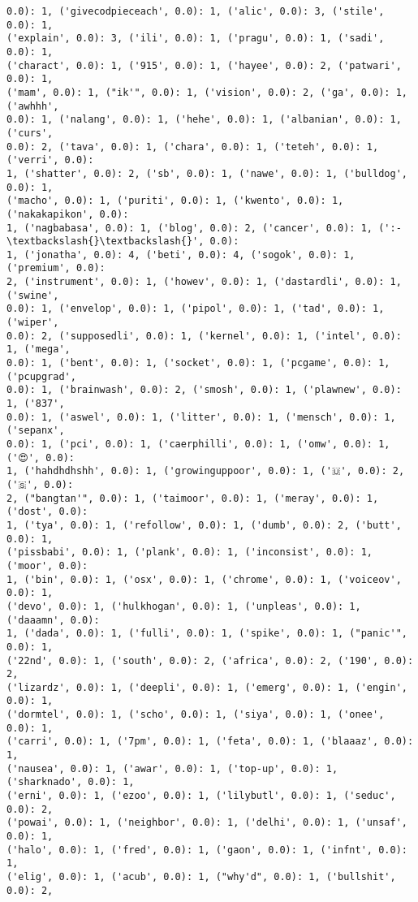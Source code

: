 \documentclass[11pt]{article}
\begin{document}
\begin{Verbatim}[commandchars=\\\{\}]
0.0): 1, ('givecodpieceach', 0.0): 1, ('alic', 0.0): 3, ('stile', 0.0): 1,
('explain', 0.0): 3, ('ili', 0.0): 1, ('pragu', 0.0): 1, ('sadi', 0.0): 1,
('charact', 0.0): 1, ('915', 0.0): 1, ('hayee', 0.0): 2, ('patwari', 0.0): 1,
('mam', 0.0): 1, ("ik'", 0.0): 1, ('vision', 0.0): 2, ('ga', 0.0): 1, ('awhhh',
0.0): 1, ('nalang', 0.0): 1, ('hehe', 0.0): 1, ('albanian', 0.0): 1, ('curs',
0.0): 2, ('tava', 0.0): 1, ('chara', 0.0): 1, ('teteh', 0.0): 1, ('verri', 0.0):
1, ('shatter', 0.0): 2, ('sb', 0.0): 1, ('nawe', 0.0): 1, ('bulldog', 0.0): 1,
('macho', 0.0): 1, ('puriti', 0.0): 1, ('kwento', 0.0): 1, ('nakakapikon', 0.0):
1, ('nagbabasa', 0.0): 1, ('blog', 0.0): 2, ('cancer', 0.0): 1, (':-\textbackslash{}\textbackslash{}', 0.0):
1, ('jonatha', 0.0): 4, ('beti', 0.0): 4, ('sogok', 0.0): 1, ('premium', 0.0):
2, ('instrument', 0.0): 1, ('howev', 0.0): 1, ('dastardli', 0.0): 1, ('swine',
0.0): 1, ('envelop', 0.0): 1, ('pipol', 0.0): 1, ('tad', 0.0): 1, ('wiper',
0.0): 2, ('supposedli', 0.0): 1, ('kernel', 0.0): 1, ('intel', 0.0): 1, ('mega',
0.0): 1, ('bent', 0.0): 1, ('socket', 0.0): 1, ('pcgame', 0.0): 1, ('pcupgrad',
0.0): 1, ('brainwash', 0.0): 2, ('smosh', 0.0): 1, ('plawnew', 0.0): 1, ('837',
0.0): 1, ('aswel', 0.0): 1, ('litter', 0.0): 1, ('mensch', 0.0): 1, ('sepanx',
0.0): 1, ('pci', 0.0): 1, ('caerphilli', 0.0): 1, ('omw', 0.0): 1, ('😍', 0.0):
1, ('hahdhdhshh', 0.0): 1, ('growinguppoor', 0.0): 1, ('🇺', 0.0): 2, ('🇸', 0.0):
2, ("bangtan'", 0.0): 1, ('taimoor', 0.0): 1, ('meray', 0.0): 1, ('dost', 0.0):
1, ('tya', 0.0): 1, ('refollow', 0.0): 1, ('dumb', 0.0): 2, ('butt', 0.0): 1,
('pissbabi', 0.0): 1, ('plank', 0.0): 1, ('inconsist', 0.0): 1, ('moor', 0.0):
1, ('bin', 0.0): 1, ('osx', 0.0): 1, ('chrome', 0.0): 1, ('voiceov', 0.0): 1,
('devo', 0.0): 1, ('hulkhogan', 0.0): 1, ('unpleas', 0.0): 1, ('daaamn', 0.0):
1, ('dada', 0.0): 1, ('fulli', 0.0): 1, ('spike', 0.0): 1, ("panic'", 0.0): 1,
('22nd', 0.0): 1, ('south', 0.0): 2, ('africa', 0.0): 2, ('190', 0.0): 2,
('lizardz', 0.0): 1, ('deepli', 0.0): 1, ('emerg', 0.0): 1, ('engin', 0.0): 1,
('dormtel', 0.0): 1, ('scho', 0.0): 1, ('siya', 0.0): 1, ('onee', 0.0): 1,
('carri', 0.0): 1, ('7pm', 0.0): 1, ('feta', 0.0): 1, ('blaaaz', 0.0): 1,
('nausea', 0.0): 1, ('awar', 0.0): 1, ('top-up', 0.0): 1, ('sharknado', 0.0): 1,
('erni', 0.0): 1, ('ezoo', 0.0): 1, ('lilybutl', 0.0): 1, ('seduc', 0.0): 2,
('powai', 0.0): 1, ('neighbor', 0.0): 1, ('delhi', 0.0): 1, ('unsaf', 0.0): 1,
('halo', 0.0): 1, ('fred', 0.0): 1, ('gaon', 0.0): 1, ('infnt', 0.0): 1,
('elig', 0.0): 1, ('acub', 0.0): 1, ("why'd", 0.0): 1, ('bullshit', 0.0): 2,

\end{Verbatim}
\end{document}
